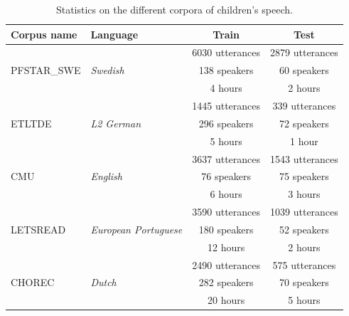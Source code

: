 \begin{table}[h]
    \begin{center}

    \begin{tabular}{llcc}
    \hline
    Corpus name                  & Language                                      & Train           & Test            \\ \hline
    \multirow{3}{*}{PFSTAR\_SWE} & \multirow{3}{*}{\textit{Swedish}}             & 6030 utterances & 2879 utterances \\
                                 &                                               & 138 speakers    & 60 speakers     \\
                                 &                                               & 4 hours         & 2 hours         \\ \hline
    \multirow{3}{*}{ETLTDE}      & \multirow{3}{*}{\textit{L2 German}}           & 1445 utterances & 339 utterances  \\
                                 &                                               & 296  speakers   & 72 speakers     \\
                                 &                                               & 5 hours         & 1 hour          \\ \hline
    \multirow{3}{*}{CMU}         & \multirow{3}{*}{\textit{English}}             & 3637 utterances & 1543 utterances \\
                                 &                                               & 76 speakers     & 75 speakers     \\
                                 &                                               & 6 hours         & 3 hours         \\ \hline
    \multirow{3}{*}{LETSREAD}    & \multirow{3}{*}{\textit{European Portuguese}} & 3590 utterances & 1039 utterances \\
                                 &                                               & 180 speakers    & 52 speakers     \\
                                 &                                               & 12 hours        & 2 hours         \\ \hline
    \multirow{3}{*}{CHOREC}      & \multirow{3}{*}{\textit{Dutch}}               & 2490 utterances & 575 utterances  \\
                                 &                                               & 282 speakers    & 70 speakers     \\
                                 &                                               & 20 hours        & 5 hours         \\ \hline
    \end{tabular}
    \caption{Statistics on the different corpora of children's speech.}
\label{tab:statistics2}

\end{center}
    \end{table}

